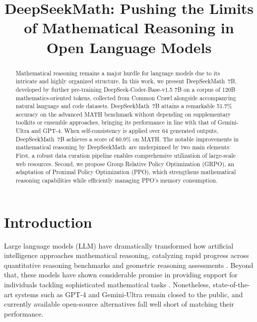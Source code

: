 \title{DeepSeekMath: Pushing the Limits of Mathematical Reasoning in Open Language Models}

\begin{abstract}
Mathematical reasoning remains a major hurdle for language models due to its intricate and highly organized structure. In this work, we present DeepSeekMath~7B, developed by further pre-training DeepSeek-Coder-Base-v1.5 7B on a corpus of 120B mathematics-oriented tokens, collected from Common Crawl alongside accompanying natural language and code datasets. DeepSeekMath~7B attains a remarkable 51.7\% accuracy on the advanced MATH benchmark without depending on supplementary toolkits or ensemble approaches, bringing its performance in line with that of Gemini-Ultra and GPT-4. When self-consistency is applied over 64 generated outputs, DeepSeekMath~7B achieves a score of 60.9\% on MATH. The notable improvements in mathematical reasoning by DeepSeekMath~are underpinned by two main elements: First, a robust data curation pipeline enables comprehensive utilization of large-scale web resources. Second, we propose Group Relative Policy Optimization (GRPO), an adaptation of Proximal Policy Optimization (PPO), which strengthens mathematical reasoning capabilities while efficiently managing PPO’s memory consumption.
\end{abstract}

\section{Introduction}

Large language models (LLM) have dramatically transformed how artificial intelligence approaches mathematical reasoning, catalyzing rapid progress across quantitative reasoning benchmarks \citep{MATH} and geometric reasoning assessments \citep{trinh2024solving}. Beyond that, these models have shown considerable promise in providing support for individuals tackling sophisticated mathematical tasks \citep{tao}. Nonetheless, state-of-the-art systems such as GPT-4 \citep{gpt4} and Gemini-Ultra \citep{gemini} remain closed to the public, and currently available open-source alternatives fall well short of matching their performance.

